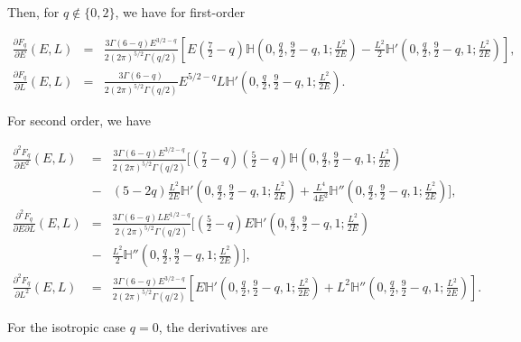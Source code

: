 \documentclass[11pt]{article}
\newcommand{\Fq}{F_{q}}
\newcommand{\mH}{\mathbb{H}}
\begin{document}
\begin{appendices}
Then, for $q \notin \{0,2\}$, we have for first-order

\begin{equation}
  \begin{array}{ccl}
    \displaystyle{\frac{\partial \Fq}{\partial E}(E,L)}&=&\displaystyle{\frac{3\Gamma(6-q)E^{3/2-q}}{2(2\pi)^{5/2}\Gamma(q/2)}\left[E\left(\frac{7}{2}-q\right)\mH(0,\frac{q}{2},\frac{9}{2}-q,1;\frac{L^{2}}{2E})-\frac{L^{2}}{2}\mH'(0,\frac{q}{2},\frac{9}{2}-q,1;\frac{L^{2}}{2E})\right]} ,\\

    \displaystyle{\frac{\partial \Fq}{\partial L}(E,L)} &=& \displaystyle{\frac{3\Gamma(6-q)}{2(2\pi)^{5/2}\Gamma(q/2)}E^{5/2-q}L\mH'(0,\frac{q}{2},\frac{9}{2}-q,1;\frac{L^{2}}{2E})} .
    \end{array}
\label{eq:d1F}
\end{equation}

For second order, we have

\begin{equation}
  \begin{array}{ccl}
    \displaystyle{\frac{\partial^{2}\Fq}{\partial E^{2}}(E,L)}&=&\displaystyle{\frac{3\Gamma(6-q)E^{3/2-q}}{2(2\pi)^{5/2}\Gamma(q/2)}\bigg[\left(\frac{7}{2}-q\right)\left(\frac{5}{2}-q\right)\mH(0,\frac{q}{2},\frac{9}{2}-q,1;\frac{L^{2}}{2E})} \\
      {}&-& \displaystyle{\left(5-2q\right)\frac{L^{2}}{2E}\mH'(0,\frac{q}{2},\frac{9}{2}-q,1;\frac{L^{2}}{2E})+\frac{L^{4}}{4E^{2}}\mH''(0,\frac{q}{2},\frac{9}{2}-q,1;\frac{L^{2}}{2E})\bigg]} ,\\

    \displaystyle{\frac{\partial^{2}\Fq}{\partial E\partial L}(E,L)} &=& \displaystyle{\frac{3\Gamma(6-q)LE^{1/2-q}}{2(2\pi)^{5/2}\Gamma(q/2)}\bigg[\left(\frac{5}{2}-q\right)E\mH'(0,\frac{q}{2},\frac{9}{2}-q,1;\frac{L^{2}}{2E})} \\
      {}&-& \displaystyle{\frac{L^{2}}{2}\mH''(0,\frac{q}{2},\frac{9}{2}-q,1;\frac{L^{2}}{2E})\bigg]} ,\\
    \displaystyle{\frac{\partial^{2}F_{q}}{\partial L^{2}}(E,L)}&=&\displaystyle{\frac{3\Gamma(6-q)E^{3/2-q}}{2(2\pi)^{5/2}\Gamma(q/2)}\left[E\mH'(0,\frac{q}{2},\frac{9}{2}-q,1;\frac{L^{2}}{2E})+L^{2}\mH''(0,\frac{q}{2},\frac{9}{2}-q,1;\frac{L^{2}}{2E})\right]} .
    \end{array}
\label{eq:d2F}
\end{equation}

For the isotropic case $q=0$, the derivatives are


\end{appendices}
\end{document}

